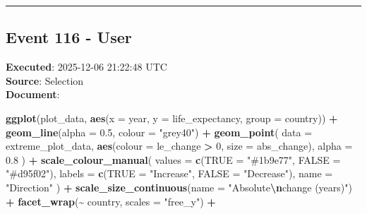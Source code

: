 \documentclass[
  11pt,
]{article}
\newenvironment{Shaded}{\begin{snugshade}}{\end{snugshade}}
\newcommand{\AttributeTok}[1]{\textcolor[rgb]{0.13,0.29,0.53}{#1}}
\newcommand{\DecValTok}[1]{\textcolor[rgb]{0.00,0.00,0.81}{#1}}
\newcommand{\FloatTok}[1]{\textcolor[rgb]{0.00,0.00,0.81}{#1}}
\newcommand{\FunctionTok}[1]{\textcolor[rgb]{0.13,0.29,0.53}{\textbf{#1}}}
\newcommand{\NormalTok}[1]{#1}
\newcommand{\OtherTok}[1]{\textcolor[rgb]{0.56,0.35,0.01}{#1}}
\newcommand{\SpecialCharTok}[1]{\textcolor[rgb]{0.81,0.36,0.00}{\textbf{#1}}}
\newcommand{\StringTok}[1]{\textcolor[rgb]{0.31,0.60,0.02}{#1}}
\begin{document}
\begin{center}\rule{0.5\linewidth}{0.5pt}\end{center}

\subsection{Event 116 - User}\label{event-116---user}

\textbf{Executed}: 2025-12-06 21:22:48 UTC\\
\textbf{Source}: Selection\\
\textbf{Document}:

\begin{Shaded}
\begin{Highlighting}[]
\FunctionTok{ggplot}\NormalTok{(plot\_data, }\FunctionTok{aes}\NormalTok{(}\AttributeTok{x =}\NormalTok{ year, }\AttributeTok{y =}\NormalTok{ life\_expectancy, }\AttributeTok{group =}\NormalTok{ country)) }\SpecialCharTok{+}
  \FunctionTok{geom\_line}\NormalTok{(}\AttributeTok{alpha =} \FloatTok{0.5}\NormalTok{, }\AttributeTok{colour =} \StringTok{"grey40"}\NormalTok{) }\SpecialCharTok{+}
  \FunctionTok{geom\_point}\NormalTok{(}
    \AttributeTok{data =}\NormalTok{ extreme\_plot\_data,}
    \FunctionTok{aes}\NormalTok{(}\AttributeTok{colour =}\NormalTok{ le\_change }\SpecialCharTok{\textgreater{}} \DecValTok{0}\NormalTok{, }\AttributeTok{size =}\NormalTok{ abs\_change),}
    \AttributeTok{alpha =} \FloatTok{0.8}
\NormalTok{  ) }\SpecialCharTok{+}
  \FunctionTok{scale\_colour\_manual}\NormalTok{(}
    \AttributeTok{values =} \FunctionTok{c}\NormalTok{(}\StringTok{\textasciigrave{}}\AttributeTok{TRUE}\StringTok{\textasciigrave{}} \OtherTok{=} \StringTok{"\#1b9e77"}\NormalTok{, }\StringTok{\textasciigrave{}}\AttributeTok{FALSE}\StringTok{\textasciigrave{}} \OtherTok{=} \StringTok{"\#d95f02"}\NormalTok{),}
    \AttributeTok{labels =} \FunctionTok{c}\NormalTok{(}\StringTok{\textasciigrave{}}\AttributeTok{TRUE}\StringTok{\textasciigrave{}} \OtherTok{=} \StringTok{"Increase"}\NormalTok{, }\StringTok{\textasciigrave{}}\AttributeTok{FALSE}\StringTok{\textasciigrave{}} \OtherTok{=} \StringTok{"Decrease"}\NormalTok{),}
    \AttributeTok{name =} \StringTok{"Direction"}
\NormalTok{  ) }\SpecialCharTok{+}
  \FunctionTok{scale\_size\_continuous}\NormalTok{(}\AttributeTok{name =} \StringTok{"Absolute}\SpecialCharTok{\textbackslash{}n}\StringTok{change (years)"}\NormalTok{) }\SpecialCharTok{+}
  \FunctionTok{facet\_wrap}\NormalTok{(}\SpecialCharTok{\textasciitilde{}}\NormalTok{ country, }\AttributeTok{scales =} \StringTok{"free\_y"}\NormalTok{) }\SpecialCharTok{+}

\end{Highlighting}
\end{Shaded}
\end{document}
